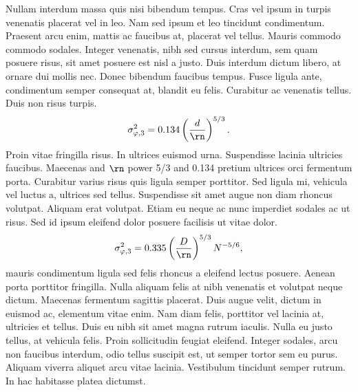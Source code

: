 Nullam interdum massa quis nisi bibendum tempus. Cras vel ipsum in turpis venenatis placerat vel in  leo. Nam sed ipsum et leo tincidunt condimentum. Praesent arcu enim, mattis ac faucibus at, placerat vel tellus. Mauris commodo commodo sodales. Integer venenatis, nibh sed cursus interdum, sem quam posuere risus, sit amet posuere est nisl a justo. Duis interdum dictum libero, at ornare dui mollis nec. Donec bibendum faucibus tempus. Fusce ligula ante, condimentum semper consequat at, blandit eu felis. Curabitur ac venenatis tellus. Duis non risus turpis. 
\begin{equation}
	\label{eqn:residualrmsptt}
	\sigma_{\varphi, 3}^2 = 0.134 \left ( \frac{d}{\rn} \right )^{5/3}.
\end{equation}
Proin vitae fringilla risus. In ultrices euismod urna. Suspendisse lacinia ultricies faucibus. Maecenas  and $\rn$ power 5/3 and 0.134 pretium ultrices orci fermentum porta. Curabitur varius risus quis ligula semper porttitor. Sed ligula mi, vehicula vel luctus a, ultrices sed tellus. Suspendisse sit amet augue non diam rhoncus volutpat. Aliquam erat volutpat. Etiam eu neque ac nunc imperdiet sodales ac ut risus. Sed id ipsum eleifend dolor posuere facilisis  ut vitae dolor. 
\begin{equation}
	\label{eqn:residualrmsptt2}
	\sigma_{\varphi, 3}^2 = 0.335 \left ( \frac{D}{\rn} \right )^{5/3} N^{-5/6},
\end{equation}
mauris condimentum ligula sed felis rhoncus a eleifend lectus posuere. Aenean porta porttitor fringilla. Nulla aliquam felis at nibh venenatis et volutpat neque dictum. Maecenas fermentum sagittis placerat. Duis augue velit, dictum in euismod ac, elementum vitae enim. Nam diam felis, porttitor vel lacinia at, ultricies et tellus. Duis eu nibh sit amet magna rutrum iaculis. Nulla eu justo tellus,  at vehicula felis. Proin sollicitudin feugiat eleifend. Integer sodales, arcu non faucibus interdum, odio tellus suscipit est, ut semper tortor sem eu purus. Aliquam viverra aliquet arcu vitae lacinia. Vestibulum tincidunt semper rutrum. In hac habitasse platea dictumst.

